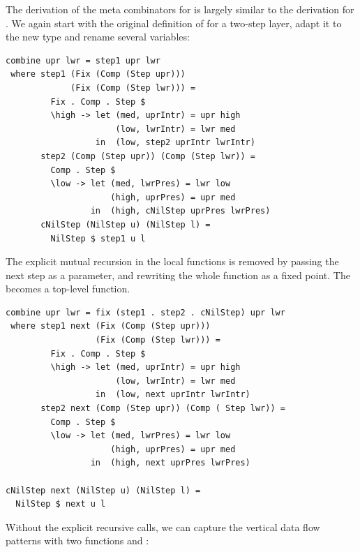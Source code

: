 \documentclass{llncs}
\begin{document}
The derivation of the meta combinators for  is largely similar to the derivation for . We again start with the original definition of  for a two-step layer, adapt it to the new  type and rename several variables:

\begin{small} %
\begin{verbatim}
combine upr lwr = step1 upr lwr
 where step1 (Fix (Comp (Step upr))) 
             (Fix (Comp (Step lwr))) = 
         Fix . Comp . Step $ 
         \high -> let (med, uprIntr) = upr high
                      (low, lwrIntr) = lwr med
                  in  (low, step2 uprIntr lwrIntr)
       step2 (Comp (Step upr)) (Comp (Step lwr)) = 
         Comp . Step $
         \low -> let (med, lwrPres) = lwr low
                     (high, uprPres) = upr med
                 in  (high, cNilStep uprPres lwrPres)
       cNilStep (NilStep u) (NilStep l) = 
         NilStep $ step1 u l 
\end{verbatim}%
\end{small}

The explicit mutual recursion in the local functions is removed by passing the next step as a parameter, and rewriting the whole function as a fixed point. The  becomes a top-level function.

\begin{small} %
\begin{verbatim}
combine upr lwr = fix (step1 . step2 . cNilStep) upr lwr
 where step1 next (Fix (Comp (Step upr))) 
                  (Fix (Comp (Step lwr))) = 
         Fix . Comp . Step $ 
         \high -> let (med, uprIntr) = upr high
                      (low, lwrIntr) = lwr med
                  in  (low, next uprIntr lwrIntr)
       step2 next (Comp (Step upr)) (Comp ( Step lwr)) = 
         Comp . Step $
         \low -> let (med, lwrPres) = lwr low
                     (high, uprPres) = upr med
                 in  (high, next uprPres lwrPres)

cNilStep next (NilStep u) (NilStep l) = 
  NilStep $ next u l
\end{verbatim}%
\end{small}

Without the explicit recursive calls, we can capture the vertical data flow patterns with two functions  and :
\end{document}
